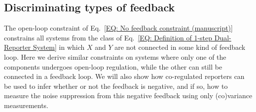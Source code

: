 \documentclass[%
 reprint,prx,
superscriptaddress,
%
%
%
%
%
%
%
%
%
 amsmath,amssymb,
 aps,
%
%
%
%
%
%
]{revtex4-2}
\begin{document}
\subsection{Discriminating types of feedback}
\label{SEC: Appendix types of feedback}
The open-loop constraint of Eq.~\eqref{EQ: No feedback constraint (manuscript)} constrains all systems from the class of Eq.~\eqref{EQ: Definition of 1-step Dual-Reporter System} in which $X$ and $Y$ are not connected in some kind of feedback loop. Here we derive similar constraints on systems where only one of the components undergoes open-loop regulation, while the other can still be connected in a feedback loop. We will also show how co-regulated reporters can be used to infer whether or not the feedback is negative, 
and if so, how to measure the noise suppression from this negative feedback using only (co)variance measurements.
\end{document}
